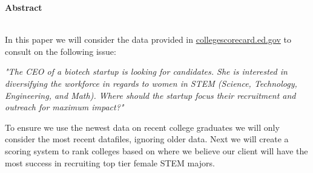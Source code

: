 
\usepackage{Sweave}





{\large\textbf{Abstract}} \\\

In this paper we will consider the data provided in \href{https://collegescorecard.ed.gov/data}{collegescorecard.ed.gov} to consult on the following issue:
\begin{center}
\emph{
"The CEO of a biotech startup is looking for candidates. She is interested in diversifying the workforce in regards to women in STEM (Science, Technology, Engineering, and Math). Where should the startup focus their recruitment and outreach for maximum impact?"
}
\end{center}
To ensure we use the newest data on recent college graduates we will only consider the most recent datafiles, ignoring older data. Next we will create a scoring system to rank colleges based on where we believe our client will have the most success in recruiting top tier female STEM majors.



